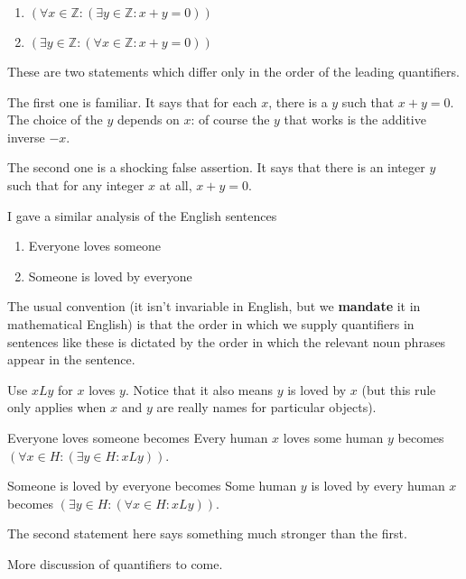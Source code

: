 \documentclass[12pt]{article}
\begin{document}
\begin{enumerate}

\item $(\forall x \in {\mathbb Z}:(\exists y \in {\mathbb Z}:x+y=0))$

\item $(\exists y \in {\mathbb Z}:(\forall x \in {\mathbb Z}:x+y=0))$

\end{enumerate}

These are two statements which differ only in the order of the leading quantifiers.

The first one is familiar.  It says that for each $x$, there is a $y$ such that $x+y=0$.  The choice of the $y$ depends on $x$:  of course the $y$ that works is the additive inverse $-x$.

The second one is a shocking false assertion.  It says that there is an integer $y$ such that for any integer $x$ at all, $x+y=0$.

I gave a similar analysis of the English sentences

\begin{enumerate}

\item Everyone loves someone

\item Someone is loved by everyone

\end{enumerate}

The usual convention (it isn't invariable in English, but we {\bf mandate} it in mathematical English) is that the order in which we supply quantifiers in sentences like these is dictated by the order in which the relevant noun phrases appear in the sentence.

Use $x L y$ for $x$ loves $y$.  Notice that it also means $y$ is loved by $x$ (but this rule only applies when $x$ and $y$ are really names for particular objects).

Everyone loves someone becomes Every human $x$ loves some human $y$ becomes $(\forall x \in H:(\exists y \in H:x L y))$.

Someone is loved by everyone becomes Some human $y$ is loved by every human $x$ becomes $(\exists y \in H:(\forall x \in H:x L y))$.

The second statement here says something much stronger than the first.

More discussion of quantifiers to come.
\end{document}

